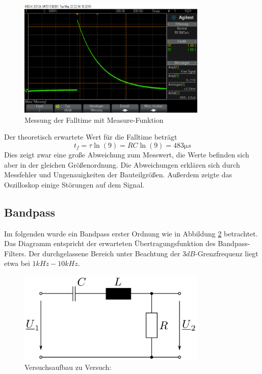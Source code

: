 \documentclass[a4paper]{article}
\begin{document}
\begin{figure}[H]
    \centering
    \includegraphics[width=0.8\textwidth]{versuch2/measure.png}
    \caption{Messung der Falltime mit Measure-Funktion}
    \label{fig:2-measure}
\end{figure}

\noindent Der theoretisch erwartete Wert für die Falltime beträgt
\begin{equation*}
    t_f=\tau \ln{(9)}=RC\ln{(9)}=483\si{\micro s}
\end{equation*}
Dies zeigt zwar eine große Abweichung zum Messwert, die Werte befinden sich aber in der gleichen Größenordnung. Die Abweichungen erklären sich durch Messfehler und Ungenauigkeiten der Bauteilgrößen. Außerdem zeigte das Oszilloskop einige Störungen auf dem Signal.

\subsection{Bandpass}
\label{subsec:versuch3-bandpass}
Im folgenden wurde ein Bandpass erster Ordnung wie in Abbildung \ref{fig:versuch3-aufbau} betrachtet.
Das Diagramm entspricht der erwarteten Übertragungsfunktion des Bandpass-Filters. Der durchgelassene Bereich unter Beachtung der $3\si{dB}$-Grenzfrequenz liegt etwa bei $1\si{kHz}-10\si{kHz}$.

\begin{figure}[H]
    \centering
    \includegraphics[width=0.8\textwidth]{versuch3/versuch3_aufbau.png}
    \caption{Versuchsaufbau zu Versuch: }
    \label{fig:versuch3-aufbau}
\end{figure}
\end{document}
